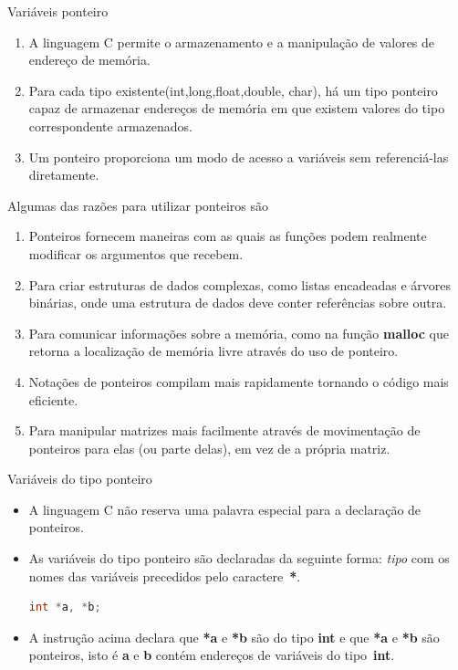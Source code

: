 \begin{frame}[c]{Variáveis ponteiro}
  \begin{enumerate}[<+->]
  \item A linguagem C permite o armazenamento e a manipulação de valores de endereço de memória.
  \item Para cada tipo existente(int,long,float,double, char), há um tipo ponteiro capaz de armazenar endereços de memória em que existem valores do tipo correspondente armazenados.
  \item Um ponteiro proporciona um modo de acesso a variáveis sem referenciá-las diretamente. 
  \end{enumerate} 
\end{frame}

\begin{frame}[c]{Algumas das razões para utilizar ponteiros são}
\begin{enumerate}[<+->]
  \item Ponteiros fornecem maneiras com as quais as funções podem realmente modificar os argumentos que recebem.
  \item Para criar estruturas de dados complexas, como listas encadeadas e árvores binárias, onde uma estrutura de dados deve conter referências sobre outra.
  \item Para comunicar informações sobre a memória, como na função \textbf{malloc} que retorna a localização de memória livre através do uso de ponteiro.
  \item Notações de ponteiros compilam mais rapidamente tornando o código mais eficiente.
  \item Para manipular matrizes mais facilmente através de movimentação de ponteiros para elas (ou parte delas), em vez de a própria matriz.
\end{enumerate}
\end{frame}

\begin{frame}[fragile,c]{Variáveis do tipo ponteiro}
  \begin{itemize}[<+->]
    \item A linguagem C não reserva uma palavra especial para a declaração de ponteiros.
    \item As variáveis do tipo ponteiro são declaradas da seguinte forma: \textit{tipo} com os nomes das variáveis precedidos pelo caractere~\textbf{*}.    
    \begin{lstlisting}[language=C]
    int *a, *b; 
        \end{lstlisting}
    \item A instrução acima declara que \textbf{*a} e \textbf{*b} são do tipo \textbf{int} e que \textbf{*a} e \textbf{*b} são ponteiros, isto é \textbf{a} e \textbf{b} contém endereços de variáveis do tipo~\textbf{int}.
  \end{itemize}
\end{frame}

